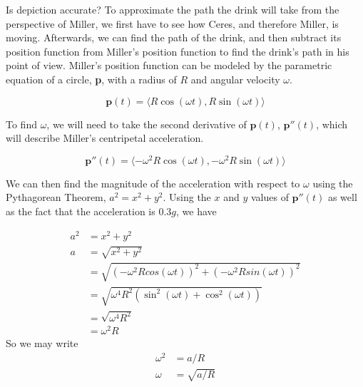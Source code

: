 \documentclass{amsart}
\renewcommand{\vec}{\textbf}
\theoremstyle{definition}
\begin{document}
\hrulefill %

Is depiction accurate? To approximate the path the drink will take
from the perspective of Miller, we first have to see how Ceres, and
therefore Miller, is moving. Afterwards, we can find the path of the
drink, and then subtract its position function from Miller's position
function to find the drink's path in his point of view. Miller's
position function can be modeled by the parametric equation of a
circle, \vec{p}, with a radius of $R$ and angular velocity $\omega$.

\[
\vec{p}(t) = \langle R\cos(\omega t),R \sin(\omega t)\rangle
\]


To find $\omega$, we will need to take the second derivative of $\vec{p}(t)$, $\vec{p}''(t)$, which will describe Miller's centripetal acceleration.

\[
\vec{p}''(t) = \langle -\omega^2 R \cos(\omega t), - \omega^2 R \sin(\omega t)\rangle
\]

We can then find the magnitude of the acceleration with respect to $\omega$ using the Pythagorean Theorem, $a^2 = x^2 + y^2$. Using the $x$ and $y$ values of $\vec{p}''(t)$ as well as the fact that the acceleration is $0.3g$, we have

\begin{align*}
    a^2 &= x^2 + y^2 \\
    a &= \sqrt{x^2 + y^2} \\
    &= \sqrt{(-\omega^2 R cos(\omega t))^2 + (- \omega^2 R sin(\omega t))^2} \\
    &= \sqrt{\omega^4 R^2 (\sin^2(\omega t) + \cos^2(\omega t))} \\
    &= \sqrt{\omega^4 R^2} \\
    &= \omega^2 R
    \end{align*}
    So we may write
\begin{align*}
    \omega^2 &= a / R\\
    \omega &= \sqrt{a/R}
\end{align*}
\end{document}
